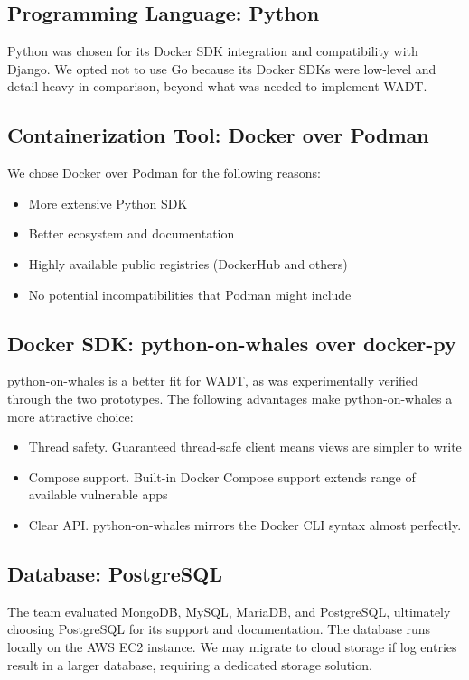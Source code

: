 \documentclass[12pt,titlepage]{article}
\begin{document}
\subsection{Programming Language: Python}

Python was chosen for its Docker SDK integration and compatibility with Django. We opted not to use Go because its Docker SDKs
were low-level and detail-heavy in comparison, beyond what was needed to implement WADT.

\subsection{Containerization Tool: Docker over Podman}

We chose Docker over Podman for the following reasons:
\begin{itemize}
    \item More extensive Python SDK
    \item Better ecosystem and documentation
    \item Highly available public registries (DockerHub and others)
    \item No potential incompatibilities that Podman might include
\end{itemize}

\subsection{Docker SDK: python-on-whales over docker-py}

python-on-whales is a better fit for WADT, as was experimentally verified through the two prototypes.
The following advantages make python-on-whales a more attractive choice:
\begin{itemize}
    \item Thread safety. Guaranteed thread-safe client means views are simpler to write
    \item Compose support. Built-in Docker Compose support extends range of available vulnerable apps
    \item Clear API. python-on-whales mirrors the Docker CLI syntax almost perfectly.
\end{itemize}

\subsection{Database: PostgreSQL}

The team evaluated MongoDB, MySQL, MariaDB, and PostgreSQL, ultimately choosing PostgreSQL for its
support and documentation.
The database runs locally on the AWS EC2 instance. We may migrate to cloud storage if log entries result
in a larger database, requiring a dedicated storage solution.
\end{document}
